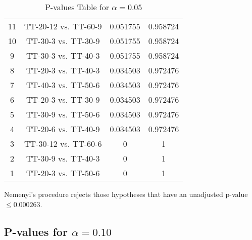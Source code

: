 \documentclass[a4paper,10pt]{article}
\begin{document}
\begin{landscape}
\begin{table}[!htp]
\begin{tabular}{cccc}
11&TT-20-12 vs. TT-60-9&0.051755&0.958724\\
10&TT-30-3 vs. TT-30-9&0.051755&0.958724\\
9&TT-30-3 vs. TT-40-3&0.051755&0.958724\\
8&TT-20-3 vs. TT-40-3&0.034503&0.972476\\
7&TT-40-3 vs. TT-50-6&0.034503&0.972476\\
6&TT-20-3 vs. TT-30-9&0.034503&0.972476\\
5&TT-30-9 vs. TT-50-6&0.034503&0.972476\\
4&TT-20-6 vs. TT-40-9&0.034503&0.972476\\
3&TT-30-12 vs. TT-60-6&0&1\\
2&TT-30-9 vs. TT-40-3&0&1\\
1&TT-20-3 vs. TT-50-6&0&1\\
\hline
\end{tabular}
\caption{P-values Table for $\alpha=0.05$}
\end{table}Nemenyi's procedure rejects those hypotheses that have an unadjusted p-value $\le0.000263$.

\pagebreak

\subsection{P-values for $\alpha=0.10$}


\end{landscape}
\end{document}
